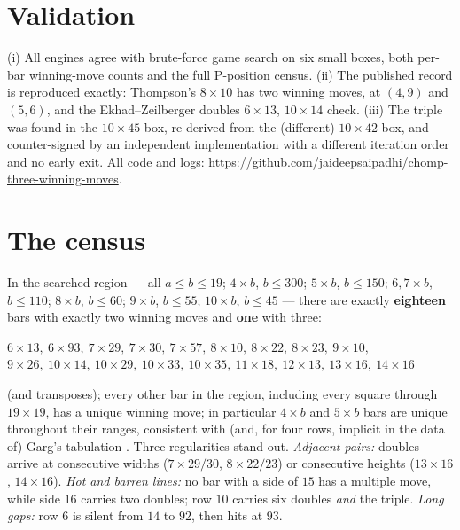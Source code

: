 \documentclass[11pt]{article}
\begin{document}
\section{Validation}
(i) All engines agree with brute-force game search on six small boxes, both per-bar
winning-move counts and the full P-position census. (ii) The published record is reproduced
exactly: Thompson's $8\times10$ has two winning moves, at $(4,9)$ and $(5,6)$, and the
Ekhad--Zeilberger doubles $6\times13$, $10\times14$ check. (iii) The triple was found in the
$10\times45$ box, re-derived from the (different) $10\times42$ box, and counter-signed by an
independent implementation with a different iteration order and no early exit. All code and
logs: \url{https://github.com/jaideepsaipadhi/chomp-three-winning-moves}.

\section{The census}\label{sec:census}
In the searched region --- all $a\le b\le19$; $4\times b$, $b\le300$; $5\times b$, $b\le150$;
$6,7\times b$, $b\le110$; $8\times b$, $b\le60$; $9\times b$, $b\le55$; $10\times b$,
$b\le45$ --- there are exactly \textbf{eighteen} bars with exactly two winning moves and
\textbf{one} with three:
\begin{center}
$6\times13,\ 6\times93,\ 7\times29,\ 7\times30,\ 7\times57,\ 8\times10,\ 8\times22,\
8\times23,\ 9\times10,$\\ $9\times26,\ 10\times14,\ 10\times29,\ 10\times33,\ 10\times35,\
11\times18,\ 12\times13,\ 13\times16,\ 14\times16$
\end{center}
(and transposes); every other bar in the region, including every square through $19\times19$,
has a unique winning move; in particular $4\times b$ and $5\times b$ bars are unique
throughout their ranges, consistent with (and, for four rows, implicit in the data of)
Garg's tabulation \cite{Garg}.
Three regularities stand out. \emph{Adjacent pairs:} doubles arrive at consecutive widths
($7\times29/30$, $8\times22/23$) or consecutive heights ($13\times16$, $14\times16$).
\emph{Hot and barren lines:} no bar with a side of $15$ has a multiple move, while side $16$
carries two doubles; row $10$ carries six doubles \emph{and} the triple. \emph{Long gaps:}
row $6$ is silent from $14$ to $92$, then hits at $93$.
\end{document}
